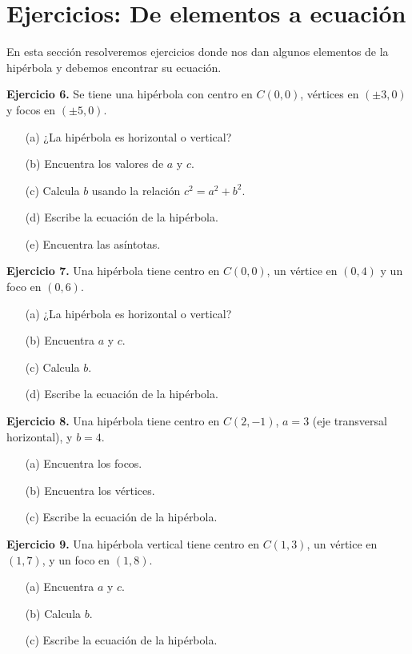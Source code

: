 \documentclass[12pt,a4paper]{article}
\begin{document}
	\section{Ejercicios: De elementos a ecuación}

	En esta sección resolveremos ejercicios donde nos dan algunos elementos de la hipérbola y debemos encontrar su ecuación.

	\bigskip

	\textbf{Ejercicio 6.} Se tiene una hipérbola con centro en $C(0,0)$, vértices en $(\pm 3,0)$ y focos en $(\pm 5,0)$.
	\begin{itemize}
		\item[(a)] ¿La hipérbola es horizontal o vertical?
		\item[(b)] Encuentra los valores de $a$ y $c$.
		\item[(c)] Calcula $b$ usando la relación $c^2=a^2+b^2$.
		\item[(d)] Escribe la ecuación de la hipérbola.
		\item[(e)] Encuentra las asíntotas.
	\end{itemize}

	\bigskip

	\textbf{Ejercicio 7.} Una hipérbola tiene centro en $C(0,0)$, un vértice en $(0,4)$ y un foco en $(0,6)$.
	\begin{itemize}
		\item[(a)] ¿La hipérbola es horizontal o vertical?
		\item[(b)] Encuentra $a$ y $c$.
		\item[(c)] Calcula $b$.
		\item[(d)] Escribe la ecuación de la hipérbola.
	\end{itemize}

	\bigskip

	\textbf{Ejercicio 8.} Una hipérbola tiene centro en $C(2,-1)$, $a=3$ (eje transversal horizontal), y $b=4$.
	\begin{itemize}
		\item[(a)] Encuentra los focos.
		\item[(b)] Encuentra los vértices.
		\item[(c)] Escribe la ecuación de la hipérbola.
	\end{itemize}

	\bigskip

	\textbf{Ejercicio 9.} Una hipérbola vertical tiene centro en $C(1,3)$, un vértice en $(1,7)$, y un foco en $(1,8)$.
	\begin{itemize}
		\item[(a)] Encuentra $a$ y $c$.
		\item[(b)] Calcula $b$.
		\item[(c)] Escribe la ecuación de la hipérbola.
	\end{itemize}
\end{document}
